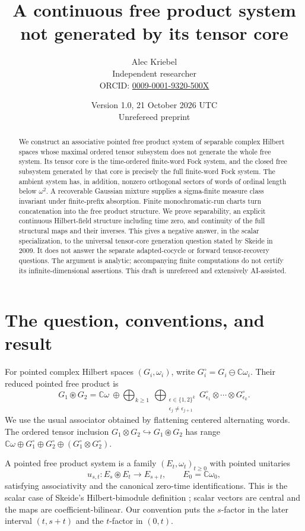 \documentclass[11pt]{article}
\title{A continuous free product system not generated by its tensor core}
\author{Alec Kriebel\\\small Independent researcher\\
\small ORCID: \href{https://orcid.org/0009-0001-9320-500X}{0009-0001-9320-500X}}
\date{Version 1.0, 21 October 2026 UTC\\\small Unrefereed preprint}
\theoremstyle{remark}\newtheorem{remark}[theorem]{Remark}
\newcommand{\C}{\mathbb C}\newcommand{\F}{\mathcal F}
\newcommand{\vac}{\omega}\newcommand{\fp}{\mathbin{\circledast}}
\begin{document}
\maketitle
\begin{abstract}
We construct an associative pointed free product system of separable complex
Hilbert spaces whose maximal ordered tensor subsystem does not generate the
whole free system. Its tensor core is the time-ordered finite-word Fock system,
and the closed free subsystem generated by that core is precisely the full
finite-word Fock system. The ambient system has, in addition, nonzero orthogonal
sectors of words of ordinal length below $\omega^2$. A recoverable Gaussian
mixture supplies a sigma-finite measure class invariant under finite-prefix
absorption. Finite monochromatic-run charts turn concatenation into the free
product structure. We prove separability, an explicit continuous Hilbert-field
structure including time zero, and continuity of the full structural maps and
their inverses. This gives a negative answer, in the scalar specialization, to
the universal tensor-core generation question stated by Skeide in 2009. It does
not answer the separate adapted-cocycle or forward tensor-recovery questions.
The argument is analytic; accompanying finite computations do not certify its
infinite-dimensional assertions. This draft is unrefereed and extensively
AI-assisted.
\end{abstract}

\section{The question, conventions, and result}

For pointed complex Hilbert spaces $(G_i,\vac_i)$, write
$G_i^\circ=G_i\ominus\C\vac_i$. Their reduced pointed free product is
\begin{equation}\label{eq:free}
 G_1\fp G_2=\C\vac\ \oplus\!
 \bigoplus_{k\geq1}\ \bigoplus_{\substack{\epsilon\in\{1,2\}^k\\
 \epsilon_j\ne\epsilon_{j+1}}}
 G_{\epsilon_1}^\circ\otimes\cdots\otimes G_{\epsilon_k}^\circ.
\end{equation}
We use the usual associator obtained by flattening centered alternating words.
The ordered tensor inclusion $G_1\otimes G_2\hookrightarrow G_1\fp G_2$
has range
$\C\vac\oplus G_1^\circ\oplus G_2^\circ
 \oplus(G_1^\circ\otimes G_2^\circ)$.

A pointed free product system is a family $(E_t,\vac_t)_{t\geq0}$ with pointed
unitaries
\[
 u_{s,t}:E_s\fp E_t\longrightarrow E_{s+t},\qquad E_0=\C\vac_0,
\]
satisfying associativity and the canonical zero-time identifications. This is
the scalar case of Skeide's Hilbert-bimodule definition
\cite[pp.~529--530]{Skeide2009}; scalar vectors are central and the maps are
coefficient-bilinear. Our convention puts the $s$-factor in the later interval
$(t,s+t)$ and the $t$-factor in $(0,t)$.
\end{document}
